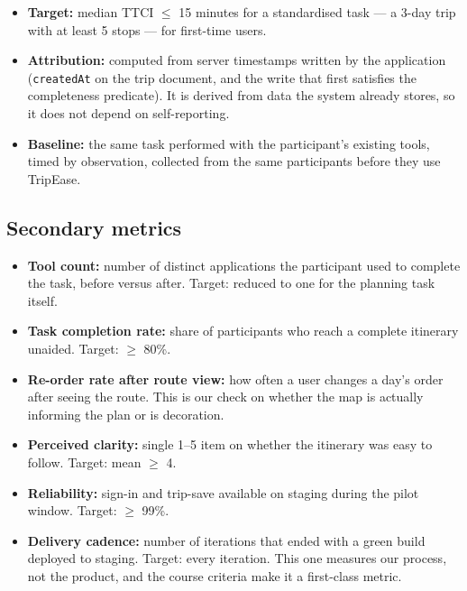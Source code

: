 \documentclass[11pt,a4paper]{article}
\begin{document}
\begin{itemize}[leftmargin=0.7cm]
    \item \textbf{Target:} median TTCI $\le$ 15 minutes
      for a standardised task --- a 3-day trip with at
      least 5 stops --- for first-time users.
    \item \textbf{Attribution:} computed from server
      timestamps written by the application
      (\texttt{createdAt} on the trip document, and the
      write that first satisfies the completeness
      predicate). It is derived from data the system
      already stores, so it does not depend on
      self-reporting.
    \item \textbf{Baseline:} the same task performed
      with the participant's existing tools, timed by
      observation, collected from the same participants
      before they use TripEase.
\end{itemize}

\subsection{Secondary metrics}
\begin{itemize}[leftmargin=0.7cm]
    \item \textbf{Tool count:} number of distinct
      applications the participant used to complete the
      task, before versus after. Target: reduced to one
      for the planning task itself.
    \item \textbf{Task completion rate:} share of
      participants who reach a complete itinerary
      unaided. Target: $\ge$ 80\%.
    \item \textbf{Re-order rate after route view:} how
      often a user changes a day's order after seeing
      the route. This is our check on whether the map
      is actually informing the plan or is decoration.
    \item \textbf{Perceived clarity:} single 1--5 item
      on whether the itinerary was easy to follow.
      Target: mean $\ge$ 4.
    \item \textbf{Reliability:} sign-in and trip-save
      available on staging during the pilot window.
      Target: $\ge$ 99\%.
    \item \textbf{Delivery cadence:} number of
      iterations that ended with a green build deployed
      to staging. Target: every iteration. This one
      measures our process, not the product, and the
      course criteria make it a first-class metric.
\end{itemize}
\end{document}
